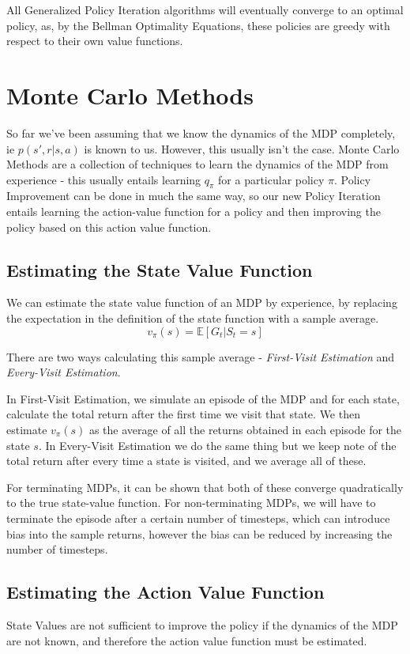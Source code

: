 \documentclass[12pt]{report}
\begin{document}
All Generalized Policy Iteration algorithms will eventually converge to an optimal policy, as, by the Bellman Optimality Equations, these policies are greedy with respect to their own value functions.


\chapter{Monte Carlo Methods}

So far we've been assuming that we know the dynamics of the MDP completely, ie $p(s', r | s, a)$ is known to us. However, this usually isn't the case. Monte Carlo Methods are a collection of techniques to learn the dynamics of the MDP from experience - this usually entails learning $q_{\pi}$  for a particular policy $\pi$. Policy Improvement can be done in much the same way, so our new Policy Iteration entails learning the action-value function for a policy and then improving the policy based on this action value function.

\section{Estimating the State Value Function}
We can estimate the state value function of an MDP by experience, by replacing the expectation in the definition of the state function with a sample average.
\begin{equation}
    v_{\pi}(s) = \mathbb{E}[G_{t} | S_{t} = s]
\end{equation}

There are two ways calculating this sample average - \textit{First-Visit Estimation} and \textit{Every-Visit Estimation}. 

In First-Visit Estimation, we simulate an episode of the MDP and for each state, calculate the total return after the first time we visit that state. We then estimate $v_{\pi}(s)$ as the average of all the returns obtained in each episode for the state $s$. In Every-Visit Estimation we do the same thing but we keep note of the total return after every time a state is visited, and we average all of these.

For terminating MDPs, it can be shown that both of these converge quadratically to the true state-value function. For non-terminating MDPs, we will have to terminate the episode after a certain number of timesteps, which can introduce bias into the sample returns, however the bias can be reduced by increasing the number of timesteps.

\section{Estimating the Action Value Function}
State Values are not sufficient to improve the policy if the dynamics of the MDP are not known, and therefore the action value function must be estimated.
\end{document}

